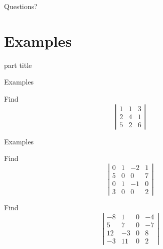 \documentclass{beamer}
\begin{document}
\begin{frame}
  Questions?
\end{frame}

\section{Examples}

\begin{frame}
  \begin{beamercolorbox}[sep=12pt,center]{part title}
    \insertsection\par
  \end{beamercolorbox}
\end{frame}

\begin{frame}{Examples}
  
  \begin{example}
    Find
    \begin{equation*}
      \left|
	\begin{array}{ccc}
          1&1&3\\
          2&4&1\\
          5&2&6
	\end{array}
      \right|
    \end{equation*}
  \end{example}
\end{frame}

\begin{frame}{Examples}
  \begin{example}
    Find
    \begin{equation*}
      \left|
        \begin{array}{cccc}
          0&1&-2&1\\
          5&0&0&7\\
          0&1&-1&0\\
          3&0&0&2
        \end{array}
      \right|
    \end{equation*}
  \end{example}
  \begin{example}
    Find
    \begin{equation*}
      \left|
        \begin{array}{cccc}
          -8&1&0&-4\\
          5&7&0&-7\\
          12&-3&0&8\\
          -3&11&0&2
        \end{array}
      \right|
    \end{equation*}
  \end{example}
\end{frame}
\end{document}
